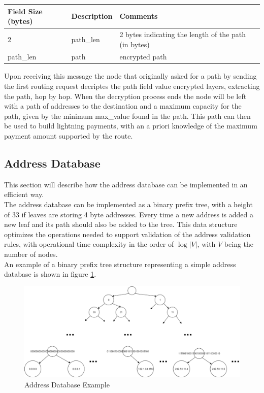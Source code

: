 \begin{table}[H]
\begin{tabular}{|l|l|l|}
\hline
\rowcolor[HTML]{C0C0C0} 
Field Size (bytes) & Description & Comments                                                                       \\ \hline
2                  & path\_len   & 2 bytes indicating the length of the path (in bytes)                           \\ \hline
path\_len          & path        & encrypted path \\ \hline
\end{tabular}
\end{table}

Upon receiving this message the node that originally asked for a path by sending the first routing request decriptes the path field value encrypted layers, extracting the path, hop by hop. When the decryption process ends the node will be left with a path of addresses to the destination and a maximum capacity for the path, given by the minimum max\_value found in the path. This path can then be used to build lightning payments, with an a priori knowledge of the maximum payment amount supported by the route.

\subsection{Address Database}
\label{ssection:add_db}

This section will describe how the address database can be implemented in an efficient way. \\
The address database can be implemented as a binary prefix tree, with a height of 33 if leaves are storing 4 byte addresses. Every time a new address is added a new leaf and its path should also be added to the tree. This data structure optimizes the operations needed to support validation of the address validation rules, with operational time complexity in the order of $\log{}|V|$, with $V$ being the number of nodes. \\
An example of a binary prefix tree structure representing a simple address database is shown in figure \ref{fig:addr_db_example}.

\begin{figure}[H]
\begin{center}
  \includegraphics[width=\linewidth]{images/addr_db_example.png}
  \caption{Address Database Example}
  \label{fig:addr_db_example}
  \end{center}
\end{figure}

